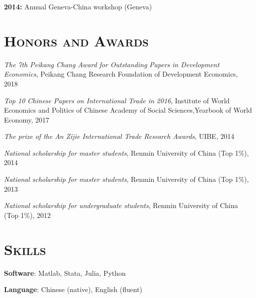 \documentclass[letterpaper]{article}
\begin{document}
\textbf{2014:} Annual Geneva-China workshop (Geneva)


\section*{\textsc{Honors and Awards}}

\textit{The 7th Peikang Chang Award for Outstanding Papers in Development Economics}, Peikang Chang Research Foundation of Development Economics, 2018

\textit{Top 10 Chinese Papers on International Trade in 2016}, Institute of World Economics and Politics of Chinese Academy of Social Sciences,Yearbook of World Economy, 2017

\textit{The  prize of the  An Zijie International Trade Research Awards}, UIBE, 2014

\textit{National scholarship for master students}, Renmin University of China (Top 1\%), 2014

\textit{National scholarship for master students}, Renmin University of China (Top 1\%), 2013

\textit{National scholarship for undergraduate students}, Renmin University of China (Top 1\%), 2012

\section*{\textsc{Skills}}
\textbf{Software}: Matlab, Stata, Julia, Python

\textbf{Language}: Chinese (native), English (fluent)
\end{document}
